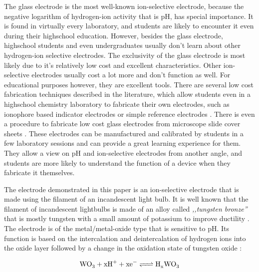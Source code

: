 \documentclass[manuscript=article, journal=jceda8]{achemso}
\begin{document}
The glass electrode is the most well-known ion-selective electrode, because the negative logarithm of hydrogen-ion activity that is pH, has special importance. 
It is found in virtually every laboratory, and students are likely to encounter it even during their highschool education. However, besides the glass electrode, highschool students and even undergraduates usually don't learn about other hydrogen-ion selective electrodes. 
The exclusivity of the glass electrode is most likely due to it's relatively low cost and excellent characteristics. Other ion-selective electrodes usually cost a lot more and don't function as well. For educational purposes however, they are excellent tools. There are several low cost fabrication techniques described in the literature, which allow students even in a highschool chemistry laboratory to fabricate their own electrodes, such as ionophore based indicator electrodes \cite{goldcamp2010inexpensive, marafie2007plastic} or simple reference electrodes \cite{riyazuddin1994low}. There is even a procedure to fabricate low cost glass electrodes from microscope slide cover sheets \cite{yong2019simple}. These electrodes can be manufactured and calibrated by students in a few laboratory sessions and can provide a great learning experience for them. They allow a view on pH and ion-selective electrodes from another angle, and students are more likely to understand the function of a device when they fabricate it themselves.

The electrode demonstrated in this paper is an ion-selective electrode that is made using the filament of an incandescent light bulb. It is well known that the filament of incandescent lightbulbs is made of an alloy called \emph{,,tungsten bronze''} that is mostly tungsten with a small amount of potassium to improve ductility \cite{cisternas2015electrode, wechter1972use, schade2010100} . The electrode is of the metal/metal-oxide type that is sensitive to pH. Its function is based on the intercalation and deintercalation of hydrogen ions into the oxide layer followed by a change in the oxidation state of tungsten oxide \cite{fenster2008single}:

\begin{equation}
        \ce{WO_3 + xH^+ + xe^- <=> H_xWO_3}
\end{equation}
\end{document}
